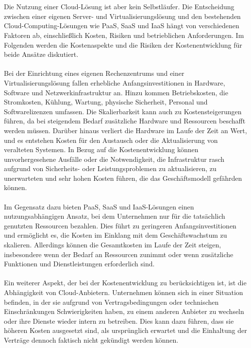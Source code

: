 \\\\
Die Nutzung einer Cloud-Lösung ist aber kein Selbstläufer. Die Entscheidung zwischen einer eigenen Server- und Virtualisierungslösung und den bestehenden Cloud-Computing-Lösungen wie PaaS, SaaS und IaaS hängt von verschiedenen Faktoren ab, einschließlich Kosten, Risiken und betrieblichen Anforderungen. Im Folgenden werden die Kostenaspekte und die Risiken der Kostenentwicklung für beide Ansätze diskutiert.
\\\\
Bei der Einrichtung eines eigenen Rechenzentrums und einer Virtualisierungslösung fallen erhebliche Anfangsinvestitionen in Hardware, Software und Netzwerkinfrastruktur an. Hinzu kommen Betriebskosten, die Stromkosten, Kühlung, Wartung, physische Sicherheit, Personal und Softwarelizenzen umfassen. Die Skalierbarkeit kann auch zu Kostensteigerungen führen, da bei steigendem Bedarf zusätzliche Hardware und Ressourcen beschafft werden müssen. Darüber hinaus verliert die Hardware im Laufe der Zeit an Wert, und es entstehen Kosten für den Austausch oder die Aktualisierung von veralteten Systemen. In Bezug auf die Kostenentwicklung können unvorhergesehene Ausfälle oder die Notwendigkeit, die Infrastruktur rasch aufgrund von Sicherheits- oder Leistungsproblemen zu aktualisieren, zu unerwarteten und sehr hohen Kosten führen, die das Geschäftsmodell gefährden können.
\\\\
Im Gegensatz dazu bieten PaaS, SaaS und IaaS-Lösungen einen nutzungsabhängigen Ansatz, bei dem Unternehmen nur für die tatsächlich genutzten Ressourcen bezahlen. Dies führt zu geringeren Anfangsinvestitionen und ermöglicht es, die Kosten im Einklang mit dem Geschäftswachstum zu skalieren. Allerdings können die Gesamtkosten im Laufe der Zeit steigen, insbesondere wenn der Bedarf an Ressourcen zunimmt oder wenn zusätzliche Funktionen und Dienstleistungen erforderlich sind.
\\\\
Ein weiterer Aspekt, der bei der Kostenentwicklung zu berücksichtigen ist, ist die Abhängigkeit von Cloud-Anbietern. Unternehmen können sich in einer Situation befinden, in der sie aufgrund von Vertragsbedingungen oder technischen Einschränkungen Schwierigkeiten haben, zu einem anderen Anbieter zu wechseln oder ihre Dienste wieder intern zu betreiben. Dies kann dazu führen, dass sie höheren Kosten ausgesetzt sind, als ursprünglich erwartet und die Einhaltung der Verträge dennoch faktisch nicht gekündigt werden können.
